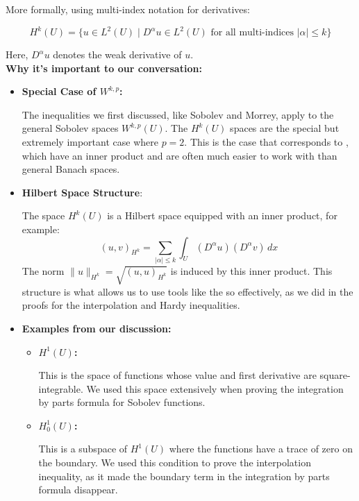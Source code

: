 \documentclass[12pt,a4paper]{report}
\begin{document}
\begin{description}
\begin{description}
\end{description}
More formally, using multi-index notation for derivatives:

\[ H^k(U) = \{ u \in L^2(U) \mid D^\alpha u \in L^2(U) \text{ for all multi-indices } |\alpha| \le k \} \]

Here, \(D^\alpha u\) denotes the weak derivative of \(u\).\\

\textbf{Why it's important to our conversation:}

\begin{itemize}

\item \textbf{Special Case of \(W^{k,p}\):} 

The inequalities we first discussed, like Sobolev and Morrey, apply to the general Sobolev spaces \(W^{k,p}(U)\). The \(H^k(U)\) spaces are the special but extremely important case where \(p=2\). This is the case that corresponds to , which have an inner product and are often much easier to work with than general Banach spaces.

\item \textbf{Hilbert Space Structure}: 

The space \(H^k(U)\) is a Hilbert space equipped with an inner product, for example:
    \[ (u, v)_{H^k} = \sum_{|\alpha| \le k} \int_U (D^\alpha u)(D^\alpha v) \, dx \]
    The norm \(\|u\|_{H^k} = \sqrt{(u,u)_{H^k}}\) is induced by this inner product. This structure is what allows us to use tools like the  so effectively, as we did in the proofs for the interpolation and Hardy inequalities.

\item \textbf{Examples from our discussion:}
\begin{itemize}

    \item \textbf{\(H^1(U)\):} 
    
    This is the space of functions whose value and first derivative are square-integrable. We used this space extensively when proving the integration by parts formula for Sobolev functions.
    
    \item \textbf{\(H_0^1(U)\):} 
    
    This is a subspace of \(H^1(U)\) where the functions have a trace of zero on the boundary. We used this condition to prove the interpolation inequality, as it made the boundary term in the integration by parts formula disappear.
    

\end{itemize}
\end{itemize}
\end{description}
\end{document}
